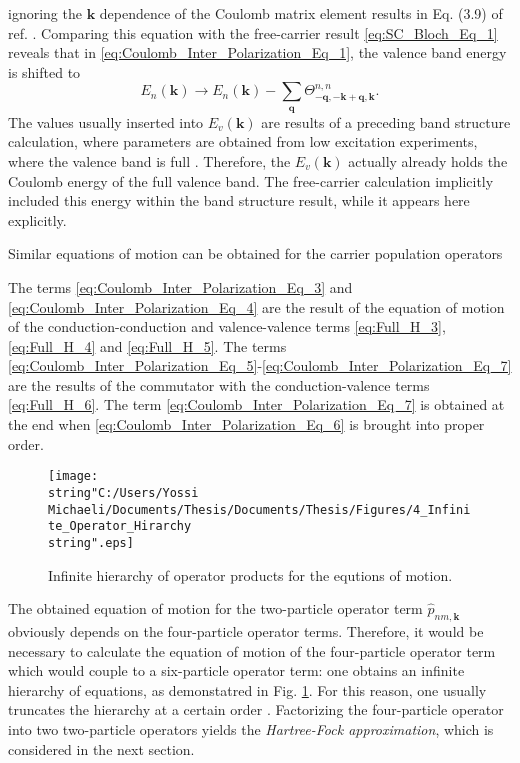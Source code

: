 ignoring the $\mathbf{k}$ dependence of the Coulomb matrix element
results in Eq. (3.9) of ref. \citet{Chow}. Comparing this equation
with the free-carrier result \ref{eq:SC_Bloch_Eq_1} reveals that
in \ref{eq:Coulomb_Inter_Polarization_Eq_1}, the valence band energy
is shifted to\begin{equation}
E_{n}(\mathbf{k})\rightarrow E_{n}(\mathbf{k})-\sum_{\mathbf{q}}\Theta_{-\mathbf{q},-\mathbf{k}+\mathbf{q},\mathbf{k}}^{n,n}.\end{equation}
The values usually inserted into $E_{v}(\mathbf{k})$ are results
of a preceding band structure calculation, where parameters are obtained
from low excitation experiments, where the valence band is full \citet{Chow}.
Therefore, the $E_{v}(\mathbf{k})$ actually already holds the Coulomb
energy of the full valence band. The free-carrier calculation implicitly
included this energy within the band structure result, while it appears
here explicitly.

Similar equations of motion can be obtained for the carrier population
operators 

The terms \ref{eq:Coulomb_Inter_Polarization_Eq_3} and \ref{eq:Coulomb_Inter_Polarization_Eq_4}
are the result of the equation of motion of the conduction-conduction
and valence-valence terms \ref{eq:Full_H_3}, \ref{eq:Full_H_4} and
\ref{eq:Full_H_5}. The terms \ref{eq:Coulomb_Inter_Polarization_Eq_5}-\ref{eq:Coulomb_Inter_Polarization_Eq_7}
are the results of the commutator with the conduction-valence terms
\ref{eq:Full_H_6}. The term \ref{eq:Coulomb_Inter_Polarization_Eq_7}
is obtained at the end when \ref{eq:Coulomb_Inter_Polarization_Eq_6}
is brought into proper order.%
\begin{figure}
\begin{centering}
\texttt{[image: \\string"C:/Users/Yossi Michaeli/Documents/Thesis/Documents/Thesis/Figures/4\_Infinite\_Operator\_Hirarchy\\string".eps]}
\par\end{centering}

\caption{\label{fig:Infinite_Hierarchy_Operators}Infinite hierarchy of operator
products for the equtions of motion.}

\end{figure}


The obtained equation of motion for the two-particle operator term
$\hat{p}_{nm,\mathbf{k}}$ obviously depends on the four-particle
operator terms. Therefore, it would be necessary to calculate the
equation of motion of the four-particle operator term which would
couple to a six-particle operator term: one obtains an infinite hierarchy
of equations, as demonstatred in Fig. \ref{fig:Infinite_Hierarchy_Operators}.
For this reason, one usually truncates the hierarchy at a certain
order \citet{Chow}. Factorizing the four-particle operator into two
two-particle operators yields the\emph{ Hartree-Fock approximation},
which is considered in the next section.


